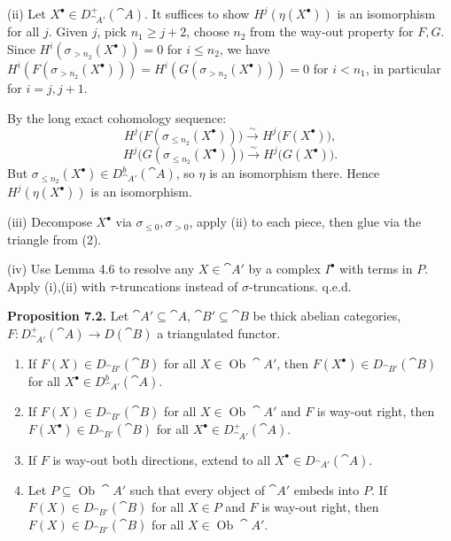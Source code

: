 (ii) Let \(X^\bullet\in D_{\cat{A}'}^+(\cat{A})\).
It suffices to show \(H^j(\eta(X^\bullet))\) is an isomorphism for all \(j\).
Given \(j\), pick \(n_1\ge j+2\), choose \(n_2\) from the way-out property for \(F,G\).
Since \(H^i(\sigma_{>n_2}(X^\bullet))=0\) for \(i\le n_2\),
we have \(H^i(F(\sigma_{>n_2}(X^\bullet)))=H^i(G(\sigma_{>n_2}(X^\bullet)))=0\) for \(i<n_1\),
in particular for \(i=j,j+1\).

\setcounter{page}{73}
By the long exact cohomology sequence:
\[
H^j\big(F(\sigma_{\le n_2}(X^\bullet))\big) \stackrel{\sim}{\to} H^j\big(F(X^\bullet)\big),
\]
\[
H^j\big(G(\sigma_{\le n_2}(X^\bullet))\big) \stackrel{\sim}{\to} H^j\big(G(X^\bullet)\big).
\]
But \(\sigma_{\le n_2}(X^\bullet)\in D_{\cat{A}'}^b(\cat{A})\), so \(\eta\) is an isomorphism there.
Hence \(H^j(\eta(X^\bullet))\) is an isomorphism.

(iii) Decompose \(X^\bullet\) via \(\sigma_{\le0},\sigma_{>0}\), apply (ii) to each piece, then glue via the triangle from (2).

(iv) Use Lemma 4.6 to resolve any \(X\in\cat{A}'\) by a complex \(I^\bullet\) with terms in \(P\).
Apply (i),(ii) with \(\tau\)-truncations instead of \(\sigma\)-truncations.
q.e.d.

\setcounter{page}{74}
\textbf{Proposition 7.2.}
Let \(\cat{A}'\subseteq\cat{A}\), \(\cat{B}'\subseteq\cat{B}\) be thick abelian categories,
\(F\colon D_{\cat{A}'}^+(\cat{A})\to D(\cat{B})\) a triangulated functor.
\begin{enumerate}
\item[(i)] If \(F(X)\in D_{\cat{B}'}(\cat{B})\) for all \(X\in\operatorname{Ob}\cat{A}'\),
then \(F(X^\bullet)\in D_{\cat{B}'}(\cat{B})\) for all \(X^\bullet\in D_{\cat{A}'}^b(\cat{A})\).

\item[(ii)] If \(F(X)\in D_{\cat{B}'}(\cat{B})\) for all \(X\in\operatorname{Ob}\cat{A}'\)
and \(F\) is way-out right,
then \(F(X^\bullet)\in D_{\cat{B}'}(\cat{B})\) for all \(X^\bullet\in D_{\cat{A}'}^+(\cat{A})\).

\item[(iii)] If \(F\) is way-out both directions, extend to all \(X^\bullet\in D_{\cat{A}'}(\cat{A})\).

\item[(iv)] Let \(P\subseteq\operatorname{Ob}\cat{A}'\) such that every object of \(\cat{A}'\) embeds into \(P\).
If \(F(X)\in D_{\cat{B}'}(\cat{B})\) for all \(X\in P\) and \(F\) is way-out right,
then \(F(X)\in D_{\cat{B}'}(\cat{B})\) for all \(X\in\operatorname{Ob}\cat{A}'\).
\end{enumerate}

